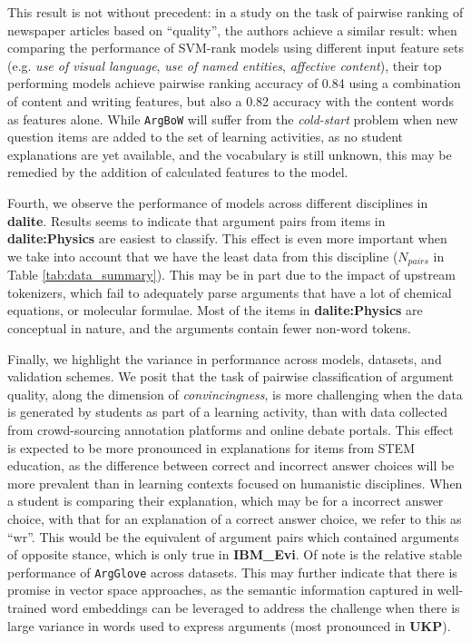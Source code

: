 \documentclass[runningheads]{llncs}
\begin{document}
This result is not without precedent: in a study on the task of pairwise 
ranking of newspaper articles based on ``quality'', the authors achieve a 
similar result: when comparing the performance of SVM-rank models using 
different input feature sets (e.g. \textit{use of visual language}, \textit{use 
of named entities}, \textit{affective content}), their top performing models 
achieve pairwise ranking accuracy of 0.84 using a combination of content and 
writing features, but also a 0.82 accuracy with the content words as features 
alone\cite{louis_what_2013}.
While \verb|ArgBoW| will suffer from the \textit{cold-start} problem when new 
question items are added to the set of learning activities, as no student 
explanations are yet available, and the vocabulary is still unknown, this may 
be remedied by the addition of calculated features to the model.

Fourth, we observe the performance of models across different disciplines in 
\textbf{dalite}. 
Results seems to indicate that argument pairs from items in 
\textbf{dalite:Physics} are easiest to classify.
This effect is even more important when we take into account that we have the 
least data from this discipline ($N_{pairs}$ in Table \ref{tab:data_summary}).
This may be in part due to the impact of upstream tokenizers, which fail to 
adequately parse arguments that have a lot of chemical equations, or molecular 
formulae.
Most of the items in \textbf{dalite:Physics} are conceptual in nature, and the 
arguments contain fewer non-word tokens.
 
Finally, we highlight the variance in performance across models, datasets, and 
validation schemes. We posit that the task of pairwise classification of 
argument quality, along the dimension of \textit{convincingness}, is more 
challenging when the data is generated by students as part of a learning 
activity, than with data collected from crowd-sourcing annotation platforms and 
online debate portals. 
This effect is expected to be more pronounced in explanations for items from 
STEM education, as the difference between correct and incorrect answer choices 
will be more prevalent than in learning contexts focused on humanistic 
disciplines.
When a student is comparing their explanation, which may be for a incorrect 
answer choice, with that for an explanation of a correct answer choice, we 
refer to this as ``wr''.
This would be the equivalent of argument pairs which contained arguments of 
opposite stance, which is only true in \textbf{IBM\_Evi}.  
Of note is the relative stable performance of \verb|ArgGlove| across datasets. 
This may further indicate that there is promise in vector space approaches, as 
the semantic information captured in well-trained word embeddings can be 
leveraged to address the challenge when there is large variance in words used 
to express arguments (most pronounced in \textbf{UKP}).
\end{document}
